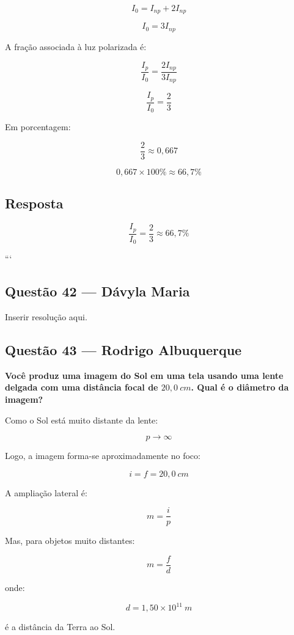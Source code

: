 \documentclass[12pt,a4paper]{article}
\begin{document}
\[
I_0 = I_{np} + 2I_{np}
\]

\[
I_0 = 3I_{np}
\]

A fração associada à luz polarizada é:

\[
\frac{I_p}{I_0}
=
\frac{2I_{np}}{3I_{np}}
\]

\[
\frac{I_p}{I_0} = \frac{2}{3}
\]

Em porcentagem:

\[
\frac{2}{3} \approx 0,667
\]

\[
0,667 \times 100\% \approx 66,7\%
\]


\subsection*{Resposta}

\[
\boxed{
\frac{I_p}{I_0} = \frac{2}{3} \approx 66,7\%
}
\]


```


\subsection{Questão 42 — Dávyla Maria}
Inserir resolução aqui.

\subsection{Questão 43 — Rodrigo Albuquerque}

\textbf{ Você produz uma imagem do Sol em uma tela usando uma lente delgada com uma distância focal de \(20,0\ cm\). Qual é o diâmetro da imagem?}

\vspace{0.5cm}

Como o Sol está muito distante da lente:

\[
p\rightarrow\infty
\]

Logo, a imagem forma-se aproximadamente no foco:

\[
i=f=20,0\ cm
\]

A ampliação lateral é:

\[
m=\frac{i}{p}
\]

Mas, para objetos muito distantes:

\[
m=\frac{f}{d}
\]

onde:

\[
d=1,50\times10^{11}\ m
\]

é a distância da Terra ao Sol.
\end{document}
